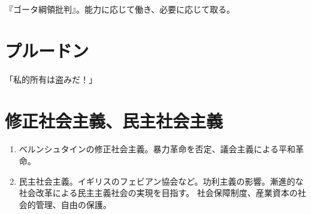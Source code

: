 \documentclass[uplatex,dvipdfmx]{jsarticle} \usepackage{mystyle}%
\begin{document}
『ゴータ綱領批判』。能力に応じて働き、必要に応じて取る。



\section{プルードン}

「私的所有は盗みだ！」


\nocite{高晃公95:マルクス}
\nocite{大川正彦04:マルクス}
\nocite{kymlicka90:_contem_polit_philos}
\nocite{marx1848:_manif_kommun_partei:水田}
\nocite{marx1848:_commun_manif}


\section{修正社会主義、民主社会主義}

\begin{enumerate}
\item ベルンシュタインの修正社会主義。暴力革命を否定、議会主義による平和革命。

\item 民主社会主義。イギリスのフェビアン協会など。功利主義の影響。漸進的な社会改革による民主主義社会の実現を目指す。
社会保障制度、産業資本の社会的管理、自由の保護。
\end{enumerate}



\ifx\mybook\undefined


\end{document}
